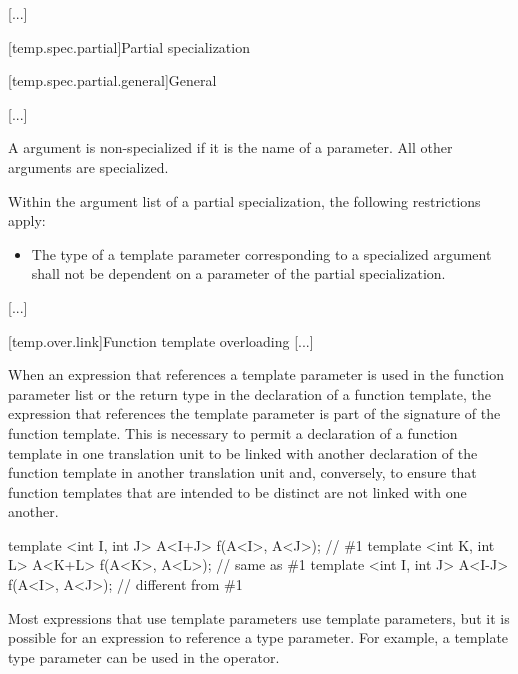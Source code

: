 \documentclass{wg21}
\begin{document}
\textcolor{noteclr}{[...]}

[temp.spec.partial]{Partial specialization}

[temp.spec.partial.general]{General}

\textcolor{noteclr}{[...]}

\pnum
A  argument is non-specialized if it is the name of a 
parameter.
All other  arguments are specialized.

\pnum
Within the argument list of a partial specialization,
the following restrictions apply:

\begin{itemize}
    \item
    The type of a template parameter corresponding to a specialized  argument
    shall not be dependent on a parameter of the partial specialization.
\end{itemize}

\textcolor{noteclr}{[...]}

[temp.over.link]{Function template overloading}
\textcolor{noteclr}{[...]}

\pnum
When an expression that references a template parameter is used in the
function parameter list or the return type in the declaration of a
function template, the expression that references the template
parameter is part of the signature of the function template.
This is
necessary to permit a declaration of a function template in one
translation unit to be linked with another declaration of the function
template in another translation unit and, conversely, to ensure that
function templates that are intended to be distinct are not linked
with one another.
\begin{example}
    \begin{codeblock}
        template <int I, int J> A<I+J> f(A<I>, A<J>);   // \#1
        template <int K, int L> A<K+L> f(A<K>, A<L>);   // same as \#1
        template <int I, int J> A<I-J> f(A<I>, A<J>);   // different from \#1
    \end{codeblock}
\end{example}
\begin{note}
    Most expressions that use template parameters use  template
    parameters, but it is possible for an expression to reference a type
    parameter.
    For example, a template type parameter can be used in the
     operator.
\end{note}
\end{document}
